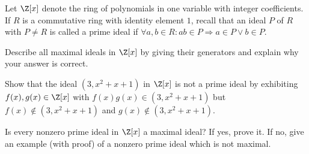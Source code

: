 Let $\Z[x]$ denote the ring of polynomials in one variable with
integer coefficients. If $R$ is a commutative ring with identity
element $1$, recall that an ideal $P$ of $R$ with $P\neq R$ is called
a prime ideal if $\forall a,b\in R: ab\in P \Rightarrow a\in P \vee b
\in P$.
\begin{alist}
\item Describe all maximal ideals in $\Z[x]$ by giving their
generators and explain why your answer is correct.
\item Show that the ideal $(3,x^2+x+1)$ in $\Z[x]$ is not a prime ideal
by exhibiting $f(x), g(x)\in \Z[x]$ with $f(x)g(x)\in (3,x^2+x+1)$ but
$f(x) \notin (3,x^2+x+1)$ and $g(x) \notin (3,x^2+x+1)$.
\item Is every nonzero prime ideal in $\Z[x]$ a maximal ideal? If yes,
prove it. If no, give an example (with proof) of a nonzero prime ideal
which is not maximal.
\end{alist}
